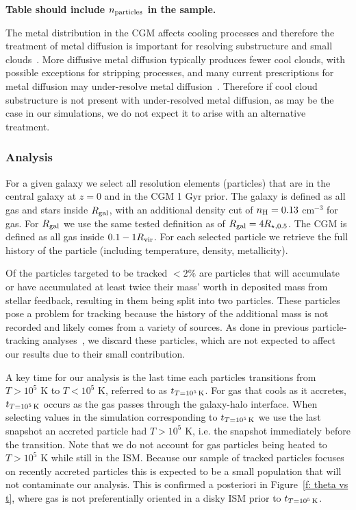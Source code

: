 \documentclass[fleqn,usenatbib]{mnras}
\newcommand{\tcon}{t_{T=10^5\,{\rm K}}}
\begin{document}
\textbf{Table should include $n_{\rm particles}$ in the sample.}

The metal distribution in the CGM affects cooling processes and therefore the treatment of metal diffusion is important for resolving substructure and small clouds~\cite{rennehan2021}.
More diffusive metal diffusion typically produces fewer cool clouds, with possible exceptions for stripping processes, and many current prescriptions for metal diffusion may under-resolve metal diffusion~\citep[e.g.][]{rennehan2019, rennehan2021}.
Therefore if cool cloud substructure is not present with under-resolved metal diffusion, as may be the case in our simulations, we do not expect it to arise with an alternative treatment.

\subsubsection{Analysis}
\label{s: methods -- analysis}

For a given galaxy we select all resolution elements (particles) that are in the central galaxy at $z=0$ and in the CGM 1 Gyr prior.
The galaxy is defined as all gas and stars inside $R_{\rm gal}$, with an additional density cut of $n_{\rm H} = 0.13$ cm$^{-3}$ for gas.
For $R_{\rm gal}$ we use the same tested definition as \cite{Hafen2019, Hafen2020} of $R_{\rm gal} = 4 R_{\star,0.5}$.
The CGM is defined as all gas inside $0.1 -1 R_{\rm vir}$.
For each selected particle we retrieve the full history of the particle (including temperature, density, metallicity).

Of the particles targeted to be tracked $<2\%$ are particles that will accumulate or have accumulated at least twice their mass' worth in deposited mass from stellar feedback, resulting in them being split into two particles.
These particles pose a problem for tracking because the history of the additional mass is not recorded and likely comes from a variety of sources.
As done in previous particle-tracking analyses~\citep{Hafen2019, Hafen2020}, we discard these particles, which are not expected to affect our results due to their small contribution.

A key time for our analysis is the last time each particles transitions from $T > 10^5$ K to $T< 10^5$ K, referred to as $\tcon$.
For gas that cools as it accretes, $\tcon$ occurs as the gas passes through the galaxy-halo interface.
When selecting values in the simulation corresponding to $\tcon$ we use the last snapshot an accreted particle had $T > 10^5$ K, i.e. the snapshot immediately before the transition.
Note that we do not account for gas particles being heated to $T > 10^5$ K while still in the ISM.
Because our sample of tracked particles focuses on recently accreted particles this is expected to be a small population that will not contaminate our analysis.
This is confirmed a posteriori in Figure~\ref{f: theta vs t}, where gas is not preferentially oriented in a disky ISM prior to $\tcon$.
\end{document}

